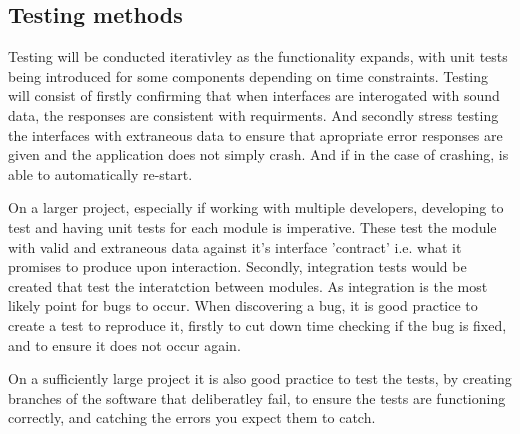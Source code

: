   \subsection{Testing methods}
    Testing will be conducted iterativley as the functionality expands, with unit tests being introduced for some components depending on time constraints. Testing will consist of firstly confirming that when interfaces are interogated with sound data, the responses are consistent with requirments. And secondly stress testing the interfaces with extraneous data to ensure that apropriate error responses are given and the application does not simply crash. And if in the case of crashing, is able to automatically re-start.
    \par
    On a larger project, especially if working with multiple developers, developing to test and having unit tests for each module is imperative. These test the module with valid and extraneous data against it's interface 'contract' i.e. what it promises to produce upon interaction. Secondly, integration tests would be created that test the interatction between modules. As integration is the most likely point for bugs to occur. When discovering a bug, it is good practice to create a test to reproduce it, firstly to cut down time checking if the bug is fixed, and to ensure it does not occur again.
    \par
    On a sufficiently large project it is also good practice to test the tests, by creating branches of the software that deliberatley fail, to ensure the tests are functioning correctly, and catching the errors you expect them to catch.

